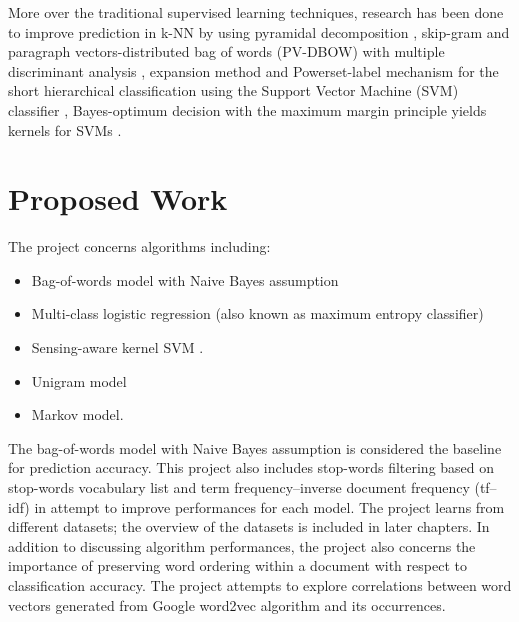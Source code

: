 \documentclass[a4paper, 11pt]{article}
\begin{document}
More over the traditional supervised learning techniques, research has been done to improve prediction in k-NN by using pyramidal decomposition \cite{heroux1998classification},  skip-gram and paragraph vectors-distributed bag of words (PV-DBOW) with multiple discriminant analysis \cite{lauren2018discriminant}, expansion method and Powerset-label mechanism for the short hierarchical classification using the Support Vector Machine (SVM) classifier \cite{salih2018term}, Bayes-optimum decision with the maximum margin principle yields kernels for SVMs \cite{ding2014sensing}.



\section{Proposed Work}
The project concerns algorithms including:
\begin{itemize}
\item Bag-of-words model with Naive Bayes assumption
\item Multi-class logistic regression (also known as maximum entropy classifier)
\item Sensing-aware kernel SVM \cite{ding2014sensing}.
\item Unigram model
\item Markov model.
\end{itemize}
The bag-of-words model with Naive Bayes assumption is considered the baseline for prediction accuracy. This project also includes stop-words filtering based on stop-words vocabulary list and term frequency–inverse document frequency (tf–idf) in attempt to improve performances for each model. The project learns from different datasets; the overview of the datasets is included in later chapters. In addition to discussing algorithm performances, the project also concerns the importance of preserving word ordering within a document with respect to classification accuracy. The project attempts to explore correlations between word vectors generated from Google word2vec algorithm and its occurrences. 
\end{document}
